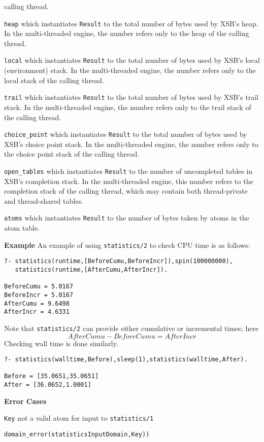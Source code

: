 \begin{description}
 calling thread.
%
\item {\tt heap} which instantiates {\tt Result} to the total number
 of bytes used by XSB's heap.  In the multi-threaded engine, the
 number refers only to the heap of the calling thread.
%
\item {\tt local} which instantiates {\tt Result} to the total number
 of bytes used by XSB's local (environment) stack.  In the
 multi-threaded engine, the number refers only to the local stack of
 the calling thread.
%
\item {\tt trail} which instantiates {\tt Result} to the total number
 of bytes used by XSB's trail stack.  In the multi-threaded engine,
 the number refers only to the trail stack of the calling thread.
%
\item {\tt choice\_point} which instantiates {\tt Result} to the total
 number of bytes used by XSB's choice point stack.  In the
 multi-threaded engine, the number refers only to the choice point
 stack of the calling thread.
%
\item {\tt open\_tables} which instantiates {\tt Result} to the number
 of uncompleted tables in XSB's completion stack.  In the
 multi-threaded engine, this number refers to the completion stack of
 the calling thread, which may contain both thread-private and
 thread-shared tables.
%
\item {\tt atoms} which instantiates {\tt Result} to the number of
 bytes taken by atoms in the atom table.
%
\ei

{\bf Example}
An example of using {\tt statistics/2} to check CPU time is as follows:

\begin{verbatim}
?- statistics(runtime,[BeforeCumu,BeforeIncr]),spin(100000000),
   statistics(runtime,[AfterCumu,AfterIncr]).

BeforeCumu = 5.0167
BeforeIncr = 5.0167
AfterCumu = 9.6498
AfterIncr = 4.6331
\end{verbatim}
Note that {\tt statistics/2} can provide either cumulative or
 incremental times; here
\[
 AfterCumu - BeforeCumu = AfterIncr
\]
Checking wall time is done similarly.
\begin{verbatim}
?- statistics(walltime,Before),sleep(1),statistics(walltime,After).

Before = [35.0651,35.0651]
After = [36.0652,1.0001]
\end{verbatim}

{\bf Error Cases}
\bi
\item {\tt Key} not a valid atom for input to {\tt statistics/1} 
\bi
\item 	{\tt domain\_error(statisticsInputDomain,Key))}
\ei
\ei
{}
\end{description}
